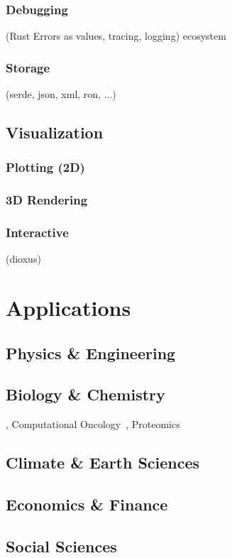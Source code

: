 \documentclass{article}
\begin{document}
\subsubsection{Debugging}
(Rust Errors as values, tracing, logging) ecosystem

\subsubsection{Storage}
(serde, json, xml, ron, ...)

\subsection{Visualization}
\subsubsection{Plotting (2D)}
\subsubsection{3D Rendering}
\subsubsection{Interactive}
(dioxus)

\section{Applications}
\label{section:applications}

\subsection{Physics \& Engineering}
\subsection{Biology \& Chemistry}
\cite{Pleyer2024}, Computational Oncology~\cite{Köster2025}, Proteomics~\cite{Anechitoaie2024}
\subsection{Climate \& Earth Sciences}
\subsection{Economics \& Finance}
\subsection{Social Sciences}
\end{document}
